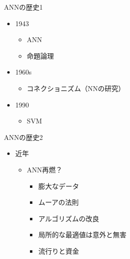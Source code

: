 \documentclass[aspectratio=169, dvipdfmx, 14pt, xcolor={svgnames,dvipsnames}]{beamer}
\def\tightlist{\itemsep1pt\parskip0pt\parsep0pt}
\begin{document}
\begin{frame}{\quad ANNの歴史1}
  \begin{itemize}
    \tightlist
    \item
          1943

          \begin{itemize}
            \tightlist
            \item
                  ANN
            \item
                  命題論理
          \end{itemize}
    \item
          1960s

          \begin{itemize}
            \tightlist
            \item
                  コネクショニズム（NNの研究）
          \end{itemize}
    \item
          1990

          \begin{itemize}
            \tightlist
            \item
                  SVM
          \end{itemize}
  \end{itemize}
\end{frame}


\begin{frame}{\quad ANNの歴史2}
  \begin{itemize}
    \item
          近年

          \begin{itemize}
            \tightlist
            \item
                  \alert{ANN再燃？}

                  \begin{itemize}
                    \tightlist
                    \item
                          膨大なデータ
                    \item
                          ムーアの法則
                    \item
                          アルゴリズムの改良
                    \item
                          局所的な最適値は意外と無害
                    \item
                          流行りと資金
                  \end{itemize}
          \end{itemize}
  \end{itemize}
\end{frame}
\end{document}
